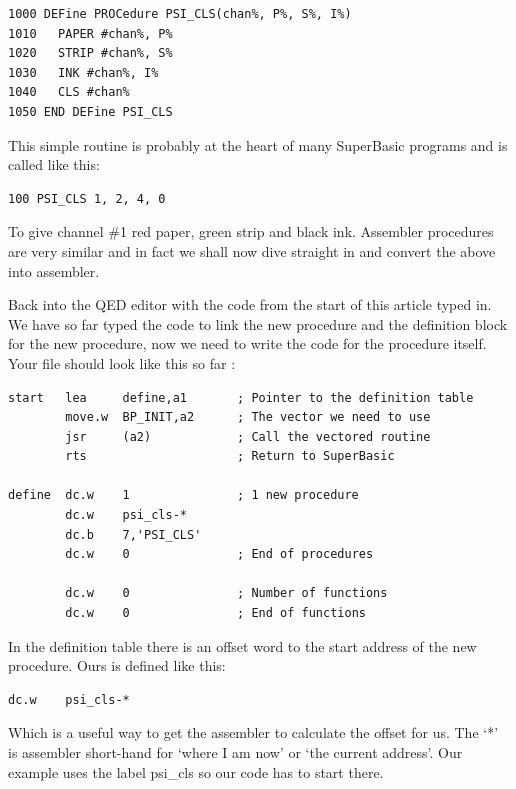 \begin{lstlisting}[firstnumber=1,language={}]
1000 DEFine PROCedure PSI_CLS(chan%, P%, S%, I%)
1010   PAPER #chan%, P%
1020   STRIP #chan%, S%
1030   INK #chan%, I%
1040   CLS #chan%
1050 END DEFine PSI_CLS
\end{lstlisting}

This simple routine is probably at the heart of many SuperBasic
    programs and is called like this:

\begin{lstlisting}[firstnumber=1,]
100 PSI_CLS 1, 2, 4, 0
\end{lstlisting}

To give channel \#1 red paper, green strip and black ink. Assembler
    procedures are very similar and in fact we shall now dive straight in and
    convert the above into assembler.

Back into the QED editor with the code from the start of this
    article typed in. We have so far typed the code to link the new procedure
    and the definition block for the new procedure, now we need to write the
    code for the procedure itself. Your file should look like this so far
   :

\begin{lstlisting}[firstnumber=1,caption={PSI\_CLS Definition Table},label={lst:PsiClsDefinitionTable}]
start   lea     define,a1       ; Pointer to the definition table
        move.w  BP_INIT,a2      ; The vector we need to use
        jsr     (a2)            ; Call the vectored routine
        rts                     ; Return to SuperBasic

define  dc.w    1               ; 1 new procedure
        dc.w    psi_cls-*
        dc.b    7,'PSI_CLS'
        dc.w    0               ; End of procedures

        dc.w    0               ; Number of functions
        dc.w    0               ; End of functions
\end{lstlisting}

In the definition table there is an offset word to the start address
    of the new procedure. Ours is defined like this:

\begin{lstlisting}[firstnumber=1,]
        dc.w    psi_cls-*
\end{lstlisting}

Which is a useful way to get the assembler to calculate the offset
    for us. The `*' is assembler short-{}hand for `where I am now' or `the
    current address'. Our example uses the label psi\_cls so our code has to
    start there.

